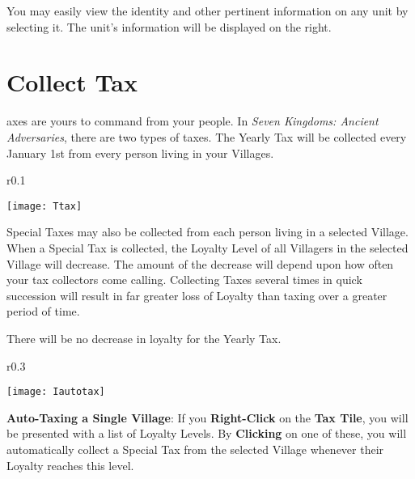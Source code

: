 You may easily view the identity and other pertinent information on any unit by selecting it. The unit’s information will be displayed on the right. \\ %

\section{\textsf{Collect Tax}}


axes are yours to command from your people. In \textit{Seven Kingdoms: Ancient Adversaries}, there are two types of taxes. The Yearly Tax will be collected every January 1st from every person living in your Villages.

\begin{wrapfigure}{r}{0.1\textwidth}
    \vspace{-20pt}
    \begin{center}
        \texttt{[image: Ttax]}
    \end{center}
    \vspace{-20pt}
\end{wrapfigure}

Special Taxes may also be collected from each person living in a selected Village. When a Special Tax is collected, the Loyalty Level of all Villagers in the selected Village will decrease. The amount of the decrease will depend upon how often your tax collectors come calling. Collecting Taxes several times in quick succession will result in far greater loss of Loyalty than taxing over a greater period of time.

There will be no decrease in loyalty for the Yearly Tax.

\begin{wrapfigure}{r}{0.3\textwidth}
    \vspace{-20pt}
    \begin{center}
        \texttt{[image: Iautotax]} %
    \end{center}
    \vspace{-20pt}
\end{wrapfigure}

\textbf{Auto-Taxing a Single Village}: If you \textbf{Right-Click} on the \textbf{Tax Tile}, you will be presented with a list of Loyalty Levels. By \textbf{Clicking} on one of these, you will automatically collect a Special Tax from the selected Village whenever their Loyalty reaches this level.

